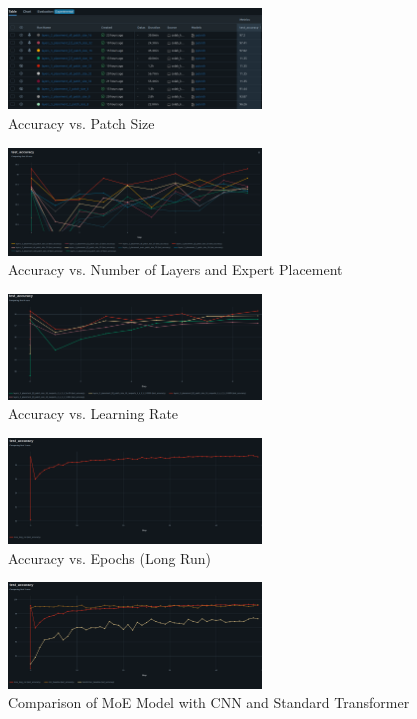 \documentclass[a4paper,11pt]{article}
\begin{document}
\begin{figure}[H]
    \centering
    \includegraphics[width=0.6\textwidth]{images/patch_size.png}
    \caption{Accuracy vs. Patch Size}
\end{figure}

\begin{figure}[H]
    \centering
    \includegraphics[width=0.6\textwidth]{images/layers_placement.png}
    \caption{Accuracy vs. Number of Layers and Expert Placement}
\end{figure}

\begin{figure}[H]
    \centering
    \includegraphics[width=0.6\textwidth]{images/learning_rate.png}
    \caption{Accuracy vs. Learning Rate}
\end{figure}

\begin{figure}[H]
    \centering
    \includegraphics[width=0.6\textwidth]{images/long_run.png}
    \caption{Accuracy vs. Epochs (Long Run)}
\end{figure}

\begin{figure}[H]
    \centering
    \includegraphics[width=0.6\textwidth]{images/baselines.png}
    \caption{Comparison of MoE Model with CNN and Standard Transformer}
\end{figure}
\end{document}
